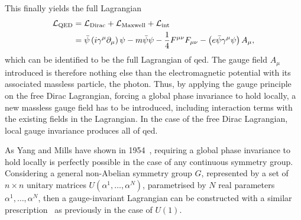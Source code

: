 This finally yields the full Lagrangian
\begin{equation}
\begin{split}
		\mathcal{L}_\mathrm{QED} & = \mathcal{L}_\mathrm{Dirac} + \mathcal{L}_\mathrm{Maxwell} + \mathcal{L}_\mathrm{int} \\
	  				& = \bar{\psi}\left(i\gamma^\mu\partial_\mu\right)\psi - m\bar{\psi}\psi - \frac{1}{4}F^{\mu\nu}F_{\mu\nu} - \left(e\bar{\psi}\gamma^\mu\psi\right)A_\mu,
\end{split}
\end{equation}
which can be identified to be the full Lagrangian of \gls{qed}. The gauge field $A_\mu$ introduced is therefore nothing else than the electromagnetic potential with its associated massless particle, the photon. Thus, by applying the gauge principle on the free Dirac Lagrangian, \ie forcing a global phase invariance to hold locally, a new massless gauge field has to be introduced, including interaction terms with the existing fields in the Lagrangian. In the case of the free Dirac Lagrangian, local gauge invariance produces all of \gls{qed}.

As Yang and Mills have shown in 1954~\cite{PhysRev.96.191}, requiring a global phase invariance to hold locally is perfectly possible in the case of any continuous symmetry group. Considering a general non-Abelian symmetry group $G$, represented by a set of $n\times n$ unitary matrices $U(\alpha^1,\dots,\alpha^N)$, parametrised by $N$ real parameters $\alpha^1,\dots,\alpha^N$, then a gauge-invariant Lagrangian can be constructed with a similar prescription~\cite{Brock:1354959} as previously in the case of $U(1)$. 

